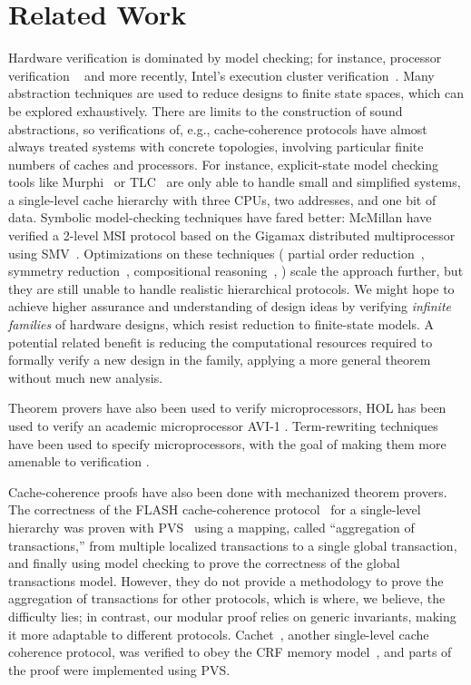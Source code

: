 ﻿\vspace{-.4cm}
\section{Related Work}
\label{relatedWork}

Hardware verification is dominated by model checking; for instance, processor
verification ~\cite{burch1994automatic, mcmillan1998verification} and more
recently, Intel's execution cluster verification~\cite{kaivola2009replacing}.
Many abstraction techniques are used to reduce designs to finite state spaces,
which can be explored exhaustively. There are limits to the construction of
sound abstractions, so verifications of, e.g., cache-coherence protocols have
almost always treated systems with concrete topologies, involving particular
finite numbers of caches and processors. For instance, explicit-state model
checking tools like Murphi~\cite{murphi} or TLC~\cite{tlc} are only able to
handle small and simplified systems, \eg{} a single-level cache hierarchy with
three CPUs, two addresses, and one bit of data. Symbolic model-checking
techniques have fared better: McMillan \etal{} have verified a 2-level MSI
protocol based on the Gigamax distributed multiprocessor using
SMV~\cite{gigamax}. Optimizations on these techniques (\eg{} partial order
reduction~\cite{part}, symmetry reduction~\cite{sym1, sym2}, compositional
reasoning~\cite{comp, Mccomp, mcc}, \etc{}) scale the approach further, but
they are still unable to handle realistic hierarchical protocols. We might hope
to achieve higher assurance and understanding of design ideas by verifying
\emph{infinite families} of hardware designs, which resist reduction to
finite-state models.  A potential related benefit is reducing the computational
resources required to formally verify a new design in the family, applying a
more general theorem without much new analysis.

Theorem provers have also been used to verify microprocessors, \eg{} HOL has
been used to verify an academic microprocessor AVI-1 \cite{windley1995formal}.
Term-rewriting techniques have been used to specify microprocessors, with
the goal of making them more amenable to verification \cite{shen1999using}.

Cache-coherence proofs have also been done with mechanized theorem provers. The
correctness of the FLASH cache-coherence protocol~\cite{flash} for a
single-level hierarchy was proven with PVS~\cite{park} using a mapping, called
``aggregation of transactions,'' from multiple localized transactions to a
single global transaction, and finally using model checking to prove the
correctness of the global transactions model. However, they do not provide a
methodology to prove the aggregation of transactions for other protocols, which
is where, we believe, the difficulty lies; in contrast, our modular proof
relies on generic invariants, making it more adaptable to different protocols.
Cachet~\cite{StoyShenArvind:Proofs}, another single-level cache coherence
protocol, was verified to obey the CRF memory model~\cite{Shen:CRF}, and
parts of the proof were implemented using PVS.

